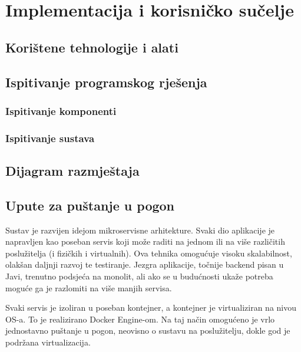 \chapter{Implementacija i korisničko sučelje}
		
		
		\section{Korištene tehnologije i alati}
			
			\eject 
		
	
		\section{Ispitivanje programskog rješenja}
			
			\subsection{Ispitivanje komponenti}
		
			
			\subsection{Ispitivanje sustava}
			
			\eject 
		
		
		\section{Dijagram razmještaja}
			
			\eject 
		
		\section{Upute za puštanje u pogon}
		
	
		
		Sustav je razvijen idejom mikroservisne arhitekture. Svaki dio aplikacije je napravljen kao poseban servis koji može raditi na jednom ili na više različitih poslužitelja (i fizičkih i virtualnih). Ova tehnika omogućuje visoku skalabilnost, olakšan daljnji razvoj te testiranje. Jezgra aplikacije, točnije backend pisan u Javi, trenutno podsjeća na monolit, ali ako se u budućnosti ukaže potreba moguće ga je razlomiti na više manjih servisa. 

		Svaki servis je izoliran u poseban kontejner, a kontejner je virtualiziran na nivou OS-a. To je realizirano Docker Engine-om. Na taj način omogućeno je vrlo jednostavno puštanje u pogon, neovisno o sustavu na poslužitelju, dokle god je podržana virtualizacija. 


